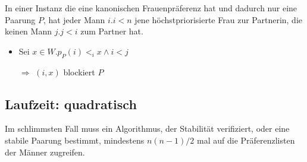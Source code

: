 \begin{frame}
  \begin{Lemma}
  \label{beste_frau}
    In einer Instanz die eine kanonischen Frauenpräferenz hat und dadurch nur eine Paarung $P$, hat jeder Mann $i.i<n$ jene höchstpriorisierte Frau zur Partnerin, die keinen Mann $j.j<i$ zum Partner hat.
  \end{Lemma}

  \begin{Beweis}
  \label{beste_frau_bew}
    \begin{itemize}[<+->]
      \item Sei $x \in W.p_{P}(i) <_{i} x \land i < j$
      \item[$\Longrightarrow$] $(i,x)$ blockiert $P$
    \end{itemize}
  \end{Beweis}
\end{frame}

\subsection{Laufzeit: quadratisch}
\begin{frame}
  \begin{Theorem}
  \label{keine_gute_loesung}
    Im schlimmsten Fall muss ein Algorithmus, der Stabilität verifiziert, oder eine stabile Paarung bestimmt, mindestens $n(n-1)/2$ mal auf die Präferenzlisten der Männer zugreifen.
  \end{Theorem}

\end{frame}
